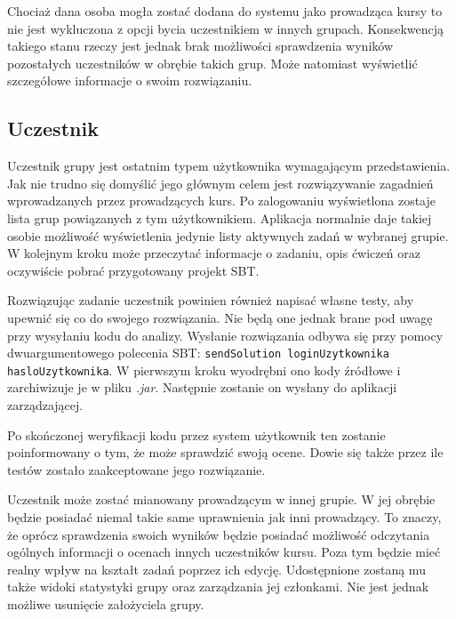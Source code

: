\documentclass[brudnopis]{xmgr}
\begin{document}
Chociaż dana osoba mogła zostać dodana do systemu jako prowadząca kursy to nie jest wykluczona z opcji bycia uczestnikiem w innych grupach. Konsekwencją takiego stanu rzeczy jest jednak brak możliwości sprawdzenia wyników pozostałych uczestników w obrębie takich grup. Może natomiast wyświetlić szczegółowe informacje o swoim rozwiązaniu.

\subsection{Uczestnik}

Uczestnik grupy jest ostatnim typem użytkownika wymagającym przedstawienia. Jak nie trudno się domyślić jego głównym celem jest rozwiązywanie zagadnień wprowadzanych przez prowadzących kurs. Po zalogowaniu wyświetlona zostaje lista grup powiązanych z tym użytkownikiem. Aplikacja normalnie daje takiej osobie możliwość wyświetlenia jedynie listy aktywnych zadań w wybranej grupie. W kolejnym kroku może przeczytać informacje o zadaniu, opis ćwiczeń oraz oczywiście pobrać przygotowany projekt SBT.   

Rozwiązując zadanie uczestnik powinien również napisać własne testy, aby upewnić się co do swojego rozwiązania. Nie będą one jednak brane pod uwagę przy wysyłaniu kodu do analizy. Wysłanie rozwiązania odbywa się przy pomocy dwuargumentowego polecenia SBT: \texttt{sendSolution loginUzytkownika hasloUzytkownika}. W pierwszym kroku wyodrębni ono kody źródłowe i zarchiwizuje je w pliku \emph{.jar}. Następnie zostanie on wysłany do aplikacji zarządzającej.

Po skończonej weryfikacji kodu przez system użytkownik ten zostanie poinformowany o tym, że może sprawdzić swoją ocene. Dowie się także przez ile testów zostało zaakceptowane jego rozwiązanie.

Uczestnik może zostać mianowany prowadzącym w innej grupie. W jej obrębie będzie posiadać niemal takie same uprawnienia jak inni prowadzący. To znaczy, że oprócz sprawdzenia swoich wyników będzie posiadać możliwość odczytania ogólnych informacji o ocenach innych uczestników kursu. Poza tym będzie mieć realny wpływ na kształt zadań poprzez ich edycję. Udostępnione zostaną mu także widoki statystyki grupy oraz zarządzania jej członkami. Nie jest jednak możliwe usunięcie założyciela grupy.
\end{document}
